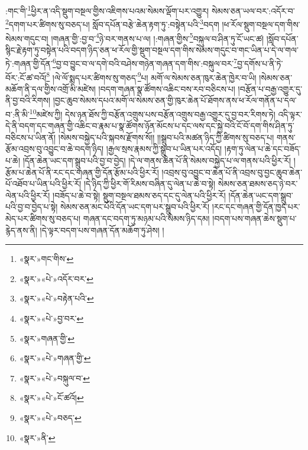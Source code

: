 :གང་གི་\footnote{«སྣར་»གང་གིས་}ཕྱིར་ན་འདི་སྡུག་བསྔལ་གྱིས་འཇིགས་པའམ་སེམས་ལྡོག་པར་འགྱུར། སེམས་ཅན་ཡལ་བར་:འདོར་བ་\footnote{«སྣར་»«པེ་»འདོར་བར་}དགག་པར་ཚིགས་སུ་བཅད་པ། སློབ་དཔོན་བརྩེ་ཆེན་རྟག་ཏུ་:བསྟེན་པའི་\footnote{«སྣར་»«པེ་»བརྟེན་པའི་}བདག །ཕ་རོལ་སྡུག་བསྔལ་དག་གིས་སེམས་གདུང་བ། །གཞན་གྱི་:བྱ་བ་\footnote{«སྣར་»«པེ་»བྱ་བར་}ཉེ་བར་གནས་པ་ལ། །:གཞན་གྱིས་\footnote{«སྣར་»གཞན་གྱི་}བསྐུལ་བ་ཤིན་ཏུ་ངོ་ཡང་ཚ། །སློབ་དཔོན་སྙིང་རྗེ་རྟག་ཏུ་བསྟེན་པའི་བདག་ཉིད་ཅན་ཕ་རོལ་གྱི་སྡུག་བསྔལ་དག་གིས་སེམས་གདུང་བ་གང་ཡིན་པ་དེ་ལ་གལ་ཏེ་:གཞན་གྱི་དོན་\footnote{«སྣར་»«པེ་»གཞན་གྱི་}བྱ་བ་བྱུང་བ་ལ་དགེ་བའི་བཤེས་གཉེན་གཞན་དག་གིས་:བསྐུལ་བར་\footnote{«སྣར་»«པེ་»བསྐུལ་བ་}བྱ་དགོས་པ་ནི་ཏེ་བོར་:ངོ་ཚ་བའོ།\footnote{«སྣར་»«པེ་»ངོ་ཚའོ།} །ལེ་ལོ་སྨད་པར་ཚིགས་སུ་གཅད་\footnote{«སྣར་»«པེ་»བཅད་}པ། མགོ་ལ་སེམས་ཅན་ཁུར་ཆེན་ཁྱེར་བ་ཡི། །སེམས་ཅན་མཆོག་ནི་དལ་གྱིས་འགྲོ་མི་མཛེས། །བདག་གཞན་སྣ་ཚོགས་འཆིང་བས་རབ་བཅིངས་པ། །བརྩོན་པ་བརྒྱ་འགྱུར་དུ་ནི་བྱ་བའི་རིགས། །བྱང་ཆུབ་སེམས་དཔའ་མགོ་ལ་སེམས་ཅན་གྱི་ཁུར་ཆེན་པོ་ཐོགས་ནས་ཕ་རོལ་གནོན་པ་དལ་བ་:ནི་མི་\footnote{«སྣར་»ནི་}མཛེས་ཀྱི། དེས་ཉན་ཐོས་ཀྱི་བརྩོན་འགྲུས་པས་བརྩོན་འགྲུས་བརྒྱ་འགྱུར་དུ་བྱ་བར་རིགས་ཏེ། འདི་ལྟར་དེ་ནི་བདག་དང་གཞན་གྱི་འཆིང་བ་རྣམ་པ་སྣ་ཚོགས་ཉོན་མོངས་པ་དང་ལས་དང་སྐྱེ་བའི་ངོ་བོ་དག་གིས་ཤིན་ཏུ་བཅིངས་པ་ཡིན་ནོ། །སེམས་བསྐྱེད་པའི་སྐབས་རྫོགས་སོ།། །།སྒྲུབ་པའི་མཚན་ཉིད་ཀྱི་ཚིགས་སུ་བཅད་པ། གནས་རྩོམ་འབྲས་བུ་འབྱུང་བ་ཆེ་བདག་ཉིད། །རྒྱལ་སྲས་རྣམས་ཀྱི་སྒྲུབ་པ་ཡིན་པར་འདོད། །རྟག་ཏུ་ལེན་པ་ཆེ་དང་བཟོད་པ་ཆེ། །དོན་ཆེན་ཡང་དག་སྒྲུབ་པའི་བྱ་བ་བྱེད། །དེ་ལ་གནས་ཆེན་པོ་ནི་སེམས་བསྐྱེད་པ་ལ་གནས་པའི་ཕྱིར་རོ། །རྩོམ་པ་ཆེན་པོ་ནི་རང་དང་གཞན་གྱི་དོན་རྩོམ་པའི་ཕྱིར་རོ། །འབྲས་བུ་འབྱུང་བ་ཆེན་པོ་ནི་འབྲས་བུ་བྱང་ཆུབ་ཆེན་པོ་འཐོབ་པ་ཡིན་པའི་ཕྱིར་རོ། །དེ་ཉིད་ཀྱི་ཕྱིར་གོ་རིམས་བཞིན་དུ་ལེན་པ་ཆེ་བ་སྟེ། སེམས་ཅན་ཐམས་ཅད་ཉེ་བར་ལེན་པའི་ཕྱིར་རོ། །བཟོད་པ་ཆེ་བ་སྟེ། སྡུག་བསྔལ་ཐམས་ཅད་དང་དུ་ལེན་པའི་ཕྱིར་རོ། །དོན་ཆེན་ཡང་དག་སྒྲུབ་པའི་བྱ་བ་བྱེད་པ་སྟེ། སེམས་ཅན་མང་པོའི་དོན་ཡང་དག་པར་སྒྲུབ་པའི་ཕྱིར་རོ། །རང་དང་གཞན་གྱི་དོན་ཁྱད་པར་མེད་པར་ཚིགས་སུ་བཅད་པ། གཞན་དང་བདག་ཏུ་མཉམ་པའི་སེམས་ཉིད་དམ། །བདག་པས་གཞན་ཆེས་སྡུག་པ་རྙེད་ནས་ནི། །དེ་ལྟར་བདག་པས་གཞན་དོན་མཆོག་ཏུ་ཤེས། །
